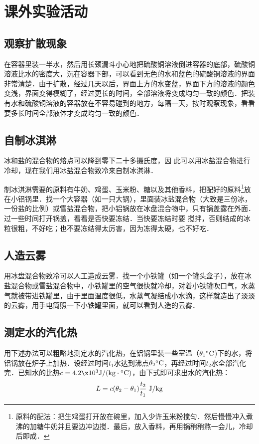 \chapter{课外实验活动}
\setcounter{section}{0}
\section{观察扩散现象}

在容器里装一半水，然后用长颈漏斗小心地把硫酸铜溶液倒进容器的底部，硫酸铜溶液比水的密度大，沉在容器下部，可以看到无色的水和蓝色的硫酸铜溶液的界面非常清楚．由于扩散，经过几天以后，界面上方的水变蓝，界面下方的溶液的颜色变浅，界面变得模糊了，经过更长的时间，全部溶液将变成均匀一致的颜色．把装有水和硫酸铜溶液的容器放在不容易碰到的地方，每隔一天，按时观察现象，看看要多长时间全部液体才变成均匀一致的颜色．

\section{自制冰淇淋}
冰和盐的混合物的熔点可以降到零下二十多摄氏度，因
此可以用冰盐混合物进行冷却，现在我们用冰盐混合物致冷来自制冰淇淋．

制冰淇淋需要的原料有牛奶、鸡蛋、玉米粉、糖以及其他香料，把配好的原料\footnote{原料的配法：把生鸡蛋打开放在碗里，加入少许玉米粉搅匀．然后慢慢冲入煮沸的加糖牛奶并且要边冲边搅．最后，放入香料，再用锅稍稍熬一会儿，冷却后即成．}放在小铝锅里．找一个大容器（如一只大锅），里面装冰盐混合物（大致是三份冰，一份盐的比例）或雪盐混合物，把小铝锅放在冰盘混合物中，只有锅盖露在外面．过一些时间打开锅盖，看看是否快要冻结．当快要冻结时要
搅拌，否则结成的冰粒很粗，不好吃；也不要冻结得太厉害，因为冻得太硬，也不好吃．

\section{人造云雾}
用冰盘混合物致冷可以人工造成云雾．找一个小铁罐（如一个罐头盒子），放在冰盐混合物或雪盐混合物中，小铁罐里的空气很快就冷却，对着小铁罐吹口气，水蒸气就被带进铁罐里，由于里面温度很低，水蒸气凝结成小水滴，这样就造出了淡淡的云雾，用手电筒照一下小铁罐里面，就可以看到人造的云雾．

\section{测定水的汽化热}
用下述办法可以粗略地测定水的汽化热，在铝锅里装一些室温（$\theta_1{}^\circ{\rm C}$)下的水，将铝锅放在炉子上加热．设经过时间$t_1$水达到沸点$\theta_2{}^\circ{\rm C}$，再经过时间$t_2$水全部汽化完．已知水的比热$c=4.2\x10^3{\rm J}/({\rm kg}\cdot {}^\circ{\rm C})$，由下式即可求出水的汽化热：
\[L=c(\theta_2-\theta_1)\frac{t_2}{t_1} \; {\rm J}/{\rm kg}  \]

